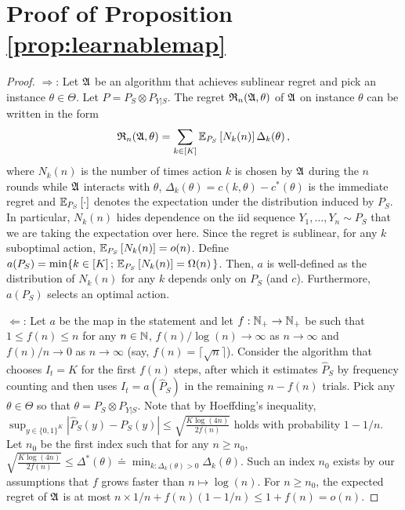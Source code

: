 \section*{Proof of Proposition \ref{prop:learnablemap}}
\begin{proof}
	$\Rightarrow$: Let $\mathfrak{A}$ be an algorithm that achieves sublinear regret
	and pick  an instance  $\theta \in\Theta$. Let $P = P_S \otimes P_{Y|S}$.
	The regret $\mathfrak{R}_n(\mathfrak{A},\theta)$ of $\mathfrak{A}$ on instance $\theta$ can be written in the form
	\begin{align*}
	\mathfrak{R}_n(\mathfrak{A},\theta) = \sum_{k\in [K]} \mathbb{E}_{P_S}\left[N_k(n)\right] \Delta_k(\theta)\,,
	\end{align*}
	where $N_k(n)$ is the number of times action $k$ is chosen by $\mathfrak{A}$ during the $n$ rounds while
	$\mathfrak{A}$ interacts with $\theta$, $\Delta_k(\theta) = c(k,\theta) - c^*(\theta)$ is the immediate regret
	and $\mathbb{E}_{P_S}\left[\cdot\right]$ denotes the expectation under the distribution induced by $P_S$.
	In particular, $N_k(n)$ hides dependence on the iid sequence $Y_1,\dots,Y_n \sim P_S$ 
	that we are taking the expectation over here. 
	Since the regret is sublinear, for any $k$ suboptimal action, $\mathbb{E}_{P_S}\left[N_k(n)\right] = o(n)$. 
	Define $a(P_S) = \min \{ k\in [K]\,;\, \mathbb{E}_{P_S}\left[N_k(n)\right] = \Omega(n) \,\}$. Then, $a$ is well-defined as the distribution of $N_k(n)$ for any $k$ depends only on $P_S$ (and $c$). Furthermore, $a(P_S)$ selects an optimal action.
	
	$\Leftarrow$: Let $a$ be the map in the statement and let $f:\mathbb{N}_+\to\mathbb{N}_+$ be such that $1\le f(n)\le n$ for any  $n\in \mathbb{N}$,
	$f(n)/\log(n) \to \infty$ as $n\to \infty$ and $f(n)/n \to 0$ as $n\to \infty$ (say, $f(n) = \lceil \sqrt{n} \rceil$).
	Consider the algorithm that chooses $I_t = K$ for the first $f(n)$ steps, after which it estimates $\hat{P}_S$ by
	frequency counting and then uses $I_t = a(\hat{P}_S)$ in the remaining $n-f(n)$ trials. 
	Pick any $\theta \in \Theta$ so that $\theta = P_S \otimes P_{Y|S}$. 
	Note that by Hoeffding's inequality, 
	$\sup_{y\in \{0,1\}^K} |\hat{P}_S(y)  - P_S(y)| \le \sqrt{\frac{K\log(4n)}{2f(n)}}$ holds with probability $1-1/n$.
	Let $n_0$ be the first index such that for any $n\ge n_0$,
	$\sqrt{\frac{K\log(4n)}{2f(n)}}\le \Delta^*(\theta) \doteq \min_{k:\Delta_k(\theta)>0} \Delta_k(\theta)$.
	Such an index $n_0$ exists by our assumptions that $f$ grows faster than $n \mapsto \log(n)$.
	For $n\ge n_0$, the expected regret of $\mathfrak{A}$ is at most $n \times 1/n + f(n) (1-1/n) \le 1+f(n) = o(n)$.
	\end{proof}

